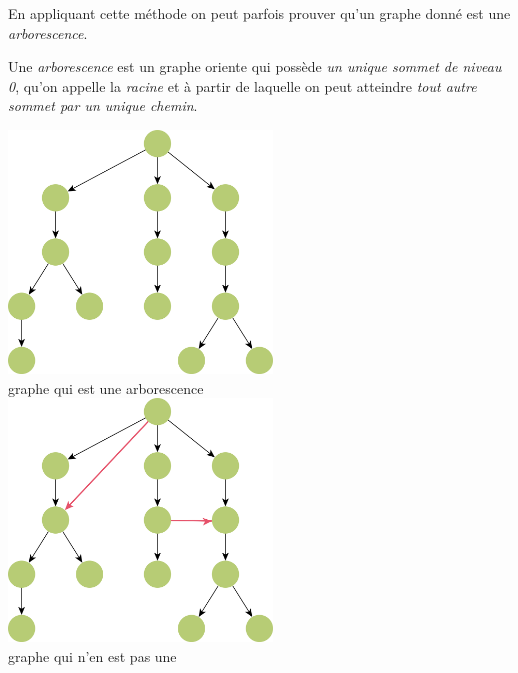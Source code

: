 En appliquant cette méthode on peut parfois prouver qu'un graphe donné est une \textit{arborescence}.

\begin{definition}[ : arborescence]
    Une \textit{arborescence} est un graphe oriente qui possède \textit{un unique sommet de niveau 0}, qu'on appelle la \textit{racine} et à partir de laquelle on peut atteindre \textit{tout autre sommet par un unique chemin}.
    \begin{multicols}{2}
        \begin{center}
            \includegraphics[width=7cm]{graphes2/img/ex_arborescence.png}\\ \footnotesize graphe qui est une arborescence\\
            \includegraphics[width=7cm]{graphes2/img/ex_pas_arborescence.png}\\ \footnotesize graphe qui n'en est pas une
        \end{center}
    \end{multicols}
\end{definition}
